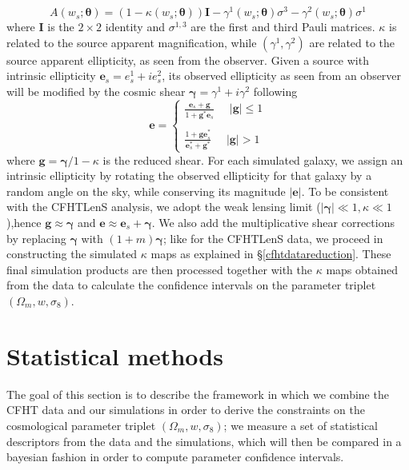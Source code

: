 \documentclass[reprint,aps,prd,superscriptaddress,showkeys,showpacs]{revtex4-1}
\begin{document}
%
\begin{equation}
A(w_s;\pmb{\theta}) = (1-\kappa(w_s;\pmb{\theta}))\pmb{I} - \gamma^1(w_s;\pmb{\theta})\sigma^3 - \gamma^2(w_s;\pmb{\theta})\sigma^1
\end{equation}  
%
where $\pmb{I}$ is the $2\times2$ identity and $\sigma^{1,3}$ are the first and third Pauli matrices. $\kappa$ is related to the source apparent magnification, while $(\gamma^1,\gamma^2)$ are related to the source apparent ellipticity, as seen from the observer. Given a source with intrinsic ellipticity $\mathbf{e}_s=e^1_s + ie^2_s$, its observed ellipticity as seen from an observer will be modified by the cosmic shear $\pmb{\gamma}=\gamma^1 + i\gamma^2$ following
%
\begin{equation}
\mathbf{e} = 
\begin{cases}
\frac{\mathbf{e}_s+\mathbf{g}}{1+\mathbf{g}^*\mathbf{e}_s} \,\,\,\,\,\,\,\, \vert \mathbf{g}\vert \leq 1 \\ \\
\frac{1+\mathbf{ge}_s^*}{\mathbf{e}_s^* + \mathbf{g}^*} \,\,\,\,\,\,\,\, \vert \mathbf{g}\vert > 1
\end{cases}
\end{equation}
%
where $\mathbf{g} = \pmb{\gamma}/1-\kappa$ is the reduced shear. For each simulated galaxy, we assign an intrinsic ellipticity by rotating the observed ellipticity for that galaxy by a random angle on the sky, while conserving its magnitude $\vert\mathbf{e}\vert$. To be consistent with the CFHTLenS analysis, we adopt the weak lensing limit ($\vert\pmb{\gamma}\vert\ll1,\kappa\ll1$),hence $\mathbf{g}\approx\pmb{\gamma}$ and $\mathbf{e}\approx \mathbf{e}_s+\pmb{\gamma}$. We also add the multiplicative shear corrections by replacing $\pmb{\gamma}$ with $(1+m)\pmb{\gamma}$; like for the CFHTLenS data, we proceed in constructing the simulated $\kappa$ maps as explained in \S\ref{cfhtdatareduction}. These final simulation products are then processed together with the $\kappa$ maps obtained from the data to calculate the confidence intervals on the parameter triplet $(\Omega_m,w,\sigma_8)$.


\section{Statistical methods}
The goal of this section is to describe the framework in which we combine the CFHT data and our simulations in order to derive the constraints on the cosmological parameter triplet $(\Omega_m,w,\sigma_8)$; we measure a set of statistical descriptors from the data and the simulations, which will then be compared in a bayesian fashion in order to compute parameter confidence intervals.
\end{document}

